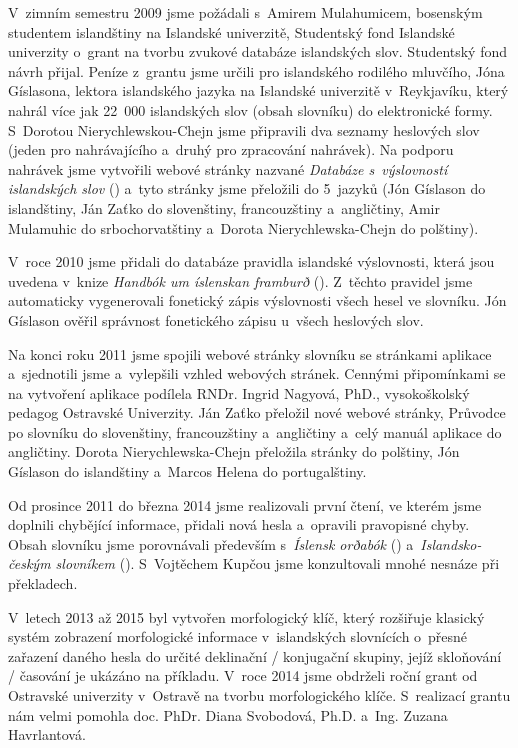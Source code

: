 V~zimním semestru 2009 jsme požádali s~Amirem Mulahumicem, bosenským studentem islandštiny na Islandské univerzitě, Studentský fond Islandské univerzity o~grant na tvorbu zvukové databáze islandských slov. 
Studentský fond návrh přijal. Peníze z~grantu jsme určili pro islandského rodilého mluvčího, Jóna Gíslasona, lektora islandského jazyka na Islandské univerzitě v~Reykjavíku, který nahrál více jak 22~000 islandských slov (obsah slovníku) do elektronické formy. 
S~Dorotou Nierychlewskou-Chejn jsme připravili dva seznamy heslových slov (jeden pro nahrávajícího a~druhý pro zpracování nahrávek). Na podporu nahrávek jsme vytvořili webové stránky nazvané \textit{Databáze s~výslovností islandských slov} (\cite {int13}) a~tyto stránky jsme přeložili do 5~jazyků (Jón Gíslason do islandštiny, Ján Zaťko do slovenštiny, francouzštiny a~angličtiny, Amir Mulamuhic do srbochorvatštiny a~Dorota Nierychlewska-Chejn do polštiny).

V~roce 2010 jsme přidali do databáze pravidla islandské výslovnosti, která jsou uvedena v~knize \textit{Handbók um íslenskan framburð} (\cite {is2}). Z~těchto pravidel jsme automaticky vygenerovali fonetický zápis výslovnosti všech hesel ve slovníku. 
Jón Gíslason ověřil správnost fonetického zápisu u~všech heslových slov.

Na konci roku 2011 jsme spojili webové stránky slovníku se stránkami aplikace a~sjednotili jsme a~vylepšili vzhled webových stránek. Cennými připomínkami se na vytvoření aplikace podílela
RNDr. Ingrid Nagyová, PhD., vysokoškolský pedagog Ostravské Univerzity. Ján Zaťko přeložil nové webové stránky, Průvodce po slovníku do slovenštiny, francouzštiny a~angličtiny a~celý manuál aplikace do angličtiny. 
Dorota Nierychlewska-Chejn přeložila stránky do polštiny, Jón Gíslason do islandštiny a~Marcos Helena do portugalštiny.

Od prosince 2011 do března 2014 jsme realizovali první čtení, ve kterém jsme doplnili chybějící informace, přidali nová hesla a~opravili pravopisné chyby. 
Obsah slovníku jsme porovnávali především s~\textit{Íslensk orðabók}  (\cite {is}) a~\textit{Islandsko-českým slovníkem} (\cite {is7}). S~Vojtěchem Kupčou jsme konzultovali mnohé nesnáze při překladech.

V~letech 2013 až 2015 byl vytvořen morfologický klíč, který rozšiřuje klasický systém zobrazení morfologické informace v~islandských slovnících o~přesné zařazení daného hesla do určité deklinační / konjugační skupiny, jejíž
skloňování / časování je ukázáno na příkladu. V~roce 2014 jsme obdrželi roční grant od Ostravské univerzity v~Ostravě na tvorbu morfologického klíče. S~realizací grantu nám velmi pomohla doc. PhDr. Diana Svobodová, Ph.D. a~Ing. Zuzana Havrlantová.

